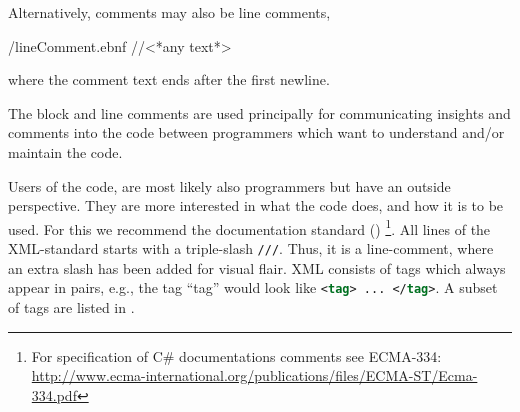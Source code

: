 \documentclass[fsharpNotes.tex]{subfiles}
\begin{document}
Alternatively, comments may also be line comments,
%
\begin{verbatimwrite}{\ebnf/lineComment.ebnf}
//<*any text*>
\end{verbatimwrite}
%
where the comment text ends after the first newline.

The block and line comments are used principally for communicating insights and comments into the code between programmers which want to understand and/or maintain the code. 

Users of the code, are most likely also programmers but have an outside perspective. They are more interested in what the code does, and how it is to be used. For this we recommend the  documentation standard () \footnote{For specification of C\# documentations comments see ECMA-334: \url{http://www.ecma-international.org/publications/files/ECMA-ST/Ecma-334.pdf}}. All lines of the XML-standard starts with a triple-slash \lstinline{///}. Thus, it is a line-comment, where an extra slash has been added for visual flair. XML consists of tags which always appear in pairs, e.g., the tag ``tag'' would look like \lstinline[language=xml]!<tag> ... </tag>!. A subset of tags are listed in .
\end{document}

